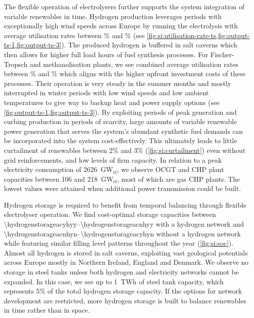 The flexible operation of electrolysers further supports the system integration
of variable renewables in time. Hydrogen production leverages periods with
exceptionally high wind speeds across Europe by running the electrolysis with
average utilisation rates between \mincfelectrolysis\% and \maxcfelectrolysis\%
(see \cref{fig:si:utilisation-rate-ts,fig:output-ts-1,fig:output-ts-3}). The produced hydrogen is buffered
in salt caverns which then allows for higher full load hours of fuel synthesis
processes. For Fischer-Tropsch and methanolisation plants, we see combined
average utilisation rates between \mincfFT\% and \maxcfFT\% which aligns with
the higher upfront investment costs of these processes. Their operation is very
steady in the summer months and mostly interrupted in winter periods with low
wind speeds and low ambient temperatures to give way to backup heat and power
supply options (see \cref{fig:output-ts-1,fig:output-ts-3}). By exploiting
periods of peak generation and curbing production in periods of scarcity, large
amounts of variable renewable power generation that serves the system's abundant
synthetic fuel demands can be incorporated into the system cost-effectively.
This ultimately leads to little curtailment of renewables between 2\% and 3\%
(\cref{fig:si:curtailment}) even without grid reinforcements, and low levels of
firm capacity. In relation to a peak electricity consumption of
2626~GW$_{\textrm{el}}$, we observe OCGT and CHP plant capacities between 106
and 218~GW$_{\textrm{el}}$, most of which are gas CHP plants. The lowest values
were attained when additional power transmission could be built.

Hydrogen storage is required to benefit from temporal balancing through flexible
electrolyser operation. We find cost-optimal storage capacities between
\SIrange{\hydrogenstorageacyhyy}{\hydrogenstorageacnhyy}{\twh} with a hydrogen
network and \SIrange{\hydrogenstorageacnhyn}{\hydrogenstorageacyhyn}{\twh}
without a hydrogen network while featuring similar filling level patterns
throughout the year (\cref{fig:si:soc}). Almost all hydrogen is stored in salt
caverns, exploiting vast geological potentials across Europe mostly in Northern
Ireland, England and Denmark. We observe no storage in steel tanks unless both
hydrogen and electricity networks cannot be expanded. In this case, we see up to
1~TWh of steel tank capacity, which represents 5\% of the total hydrogen storage
capacity. If the options for network development are restricted, more hydrogen
storage is built to balance renewables in time rather than in space.

